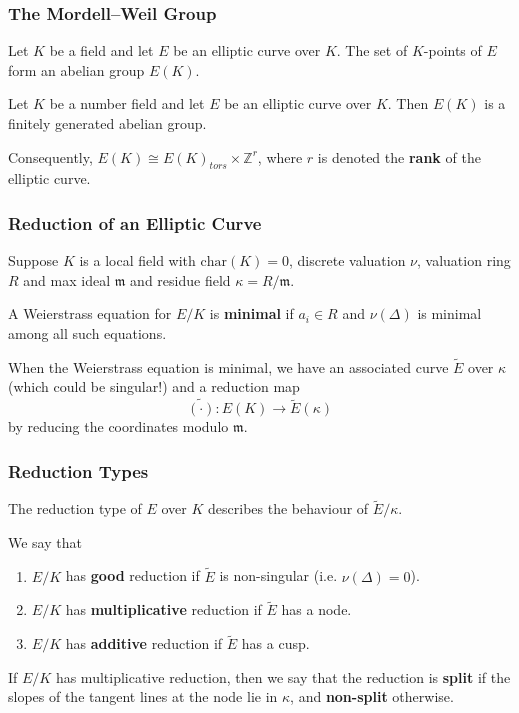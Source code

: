 \documentclass{beamer}
\newcommand{\ZZ}{\mathbb{Z}}
\theoremstyle{plain}
\begin{document}
\begin{frame}
    \frametitle{The Mordell--Weil Group}
    Let $K$ be a field and let $E$ be an elliptic curve over $K$. The set of $K$-points of $E$ form an abelian group $E(K)$. \pause
    \begin{theorem}
        Let $K$ be a number field and let $E$ be an elliptic curve over $K$. Then $E(K)$ is a finitely generated abelian group.
    \end{theorem} \pause
    Consequently, $E(K)\cong E(K)_{tors}\times\ZZ^r$, where $r$ is denoted the \textbf{rank} of the elliptic curve.

\end{frame}

\begin{frame}
    \frametitle{Reduction of an Elliptic Curve}
    Suppose $K$ is a local field with $\mathrm{char}(K)=0$, discrete valuation $\nu$, valuation ring $R$ and max ideal $\mathfrak{m}$ and residue field $\kappa=R/\mathfrak{m}$. \pause
    \begin{definition}
        A Weierstrass equation for $E/K$ is \textbf{minimal} if $a_i\in R$ and $\nu(\Delta)$ is minimal among all such equations.
    \end{definition} \pause
    When the Weierstrass equation is minimal, we have an associated curve $\tilde{E}$ over $\kappa$ (which could be singular!) and a reduction map 
    $$\widetilde{(\cdot)}:E(K)\longrightarrow \tilde{E}(\kappa)$$
    by reducing the coordinates modulo $\mathfrak{m}$.
\end{frame}

\begin{frame}
    \frametitle{Reduction Types}
    The reduction type of $E$ over $K$ describes the behaviour of $\tilde{E}/\kappa$. \pause
    \begin{definition}
        We say that
        \begin{enumerate}%
            \item $E/K$ has \textbf{good} reduction if $\tilde{E}$ is non-singular (i.e. $\nu(\Delta)=0$). \pause
            \item $E/K$ has \textbf{multiplicative} reduction if $\tilde{E}$ has a node. \pause
            \item $E/K$ has \textbf{additive} reduction if $\tilde{E}$ has a cusp.\pause
        \end{enumerate}
        If $E/K$ has multiplicative reduction, then we say that the reduction is \textbf{split} if the slopes of the tangent lines at the node lie in $\kappa$, and \textbf{non-split} otherwise.
    \end{definition}

\end{frame}
\end{document}
